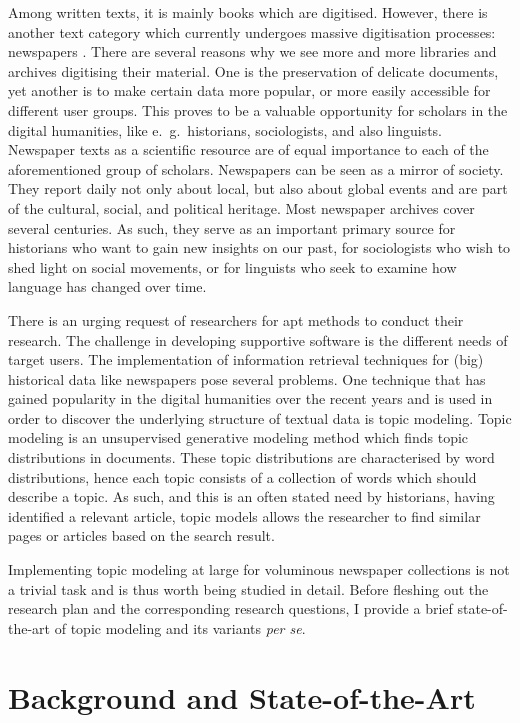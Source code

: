 Among written texts, it is mainly books which are digitised. However, there is another text category which currently undergoes massive digitisation processes: newspapers \citep{lansdall-welfarecontent2017,prestondigital2016,binghamdigitization2010}. There are several reasons why we see more and more libraries and archives digitising their material. One is the preservation of delicate documents, yet another is to make certain data more popular, or more easily accessible for different user groups. This proves to be a valuable opportunity for scholars in the digital humanities, like e.~g.~historians, sociologists, and also linguists. Newspaper texts as a scientific resource are of equal importance to each of the aforementioned group of scholars. Newspapers can be seen as a mirror of society. They report daily not only about local, but also about global events and are part of the cultural, social, and political heritage. Most newspaper archives cover several centuries. As such, they serve as an important primary source for historians who want to gain new insights on our past, for sociologists who wish to shed light on social movements, or for linguists who seek to examine how language has changed over time.

There is an urging request of researchers for apt methods to conduct their research. The challenge in developing supportive software is the different needs of target users. The implementation of information retrieval techniques for (big) historical data like newspapers pose several problems. One technique that has gained popularity in the digital humanities over the recent years and is used in order to discover the underlying structure of textual data is topic modeling. Topic modeling is an unsupervised generative modeling method which finds topic distributions in documents. These topic distributions are characterised by word distributions, hence each topic consists of a collection of words which should describe a topic. As such, and this is an often stated need by historians, having identified a relevant article, topic models allows the researcher to find similar pages or articles based on the search result.

Implementing topic modeling at large for voluminous newspaper collections is not a trivial task and is thus worth being studied in detail. Before fleshing out the research plan and the corresponding research questions, I provide a brief state-of-the-art of topic modeling and its variants \textit{per se}.

\section{Background and State-of-the-Art}

